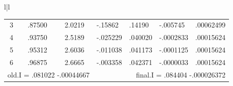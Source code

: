 \begin{figure}
\begin{tabular}{l|l}
\begin{tabular}{cccllll}
            3 & .87500 & 2.0219  &  -.15862  & .14190  & -.005745  & .00062499 \\
            4 & .93750 & 2.5189  &  -.025229 & .040020 & -.0002833 & .00015624 \\
            5 & .95312 & 2.6036  &  -.011038 & .041173 & -.0001125 & .00015624 \\
            6 & .96875 & 2.6665  &  -.003358 & .042371 & -.0000033 & .00015624 \\
            \multicolumn{3}{l}{old.I = .081022 -.00044667} & &
            \multicolumn{3}{r}{final.I = .084404 -.000026372} \\
        \end{tabular}
    \end{tabular}
\end{figure}

